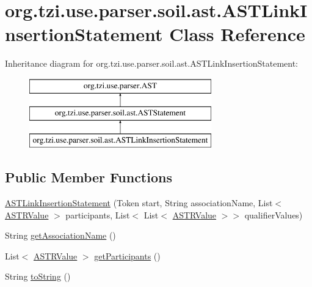 \hypertarget{classorg_1_1tzi_1_1use_1_1parser_1_1soil_1_1ast_1_1_a_s_t_link_insertion_statement}{\section{org.\-tzi.\-use.\-parser.\-soil.\-ast.\-A\-S\-T\-Link\-Insertion\-Statement Class Reference}
\label{classorg_1_1tzi_1_1use_1_1parser_1_1soil_1_1ast_1_1_a_s_t_link_insertion_statement}
}
Inheritance diagram for org.\-tzi.\-use.\-parser.\-soil.\-ast.\-A\-S\-T\-Link\-Insertion\-Statement\-:\begin{figure}[H]
\begin{center}
\leavevmode
\includegraphics[height=3.000000cm]{classorg_1_1tzi_1_1use_1_1parser_1_1soil_1_1ast_1_1_a_s_t_link_insertion_statement}
\end{center}
\end{figure}
\subsection*{Public Member Functions}
\begin{DoxyCompactItemize}
\item 
\hyperlink{classorg_1_1tzi_1_1use_1_1parser_1_1soil_1_1ast_1_1_a_s_t_link_insertion_statement_a12470613147ebed72fed8f2e2fc85adc}{A\-S\-T\-Link\-Insertion\-Statement} (Token start, String association\-Name, List$<$ \hyperlink{classorg_1_1tzi_1_1use_1_1parser_1_1soil_1_1ast_1_1_a_s_t_r_value}{A\-S\-T\-R\-Value} $>$ participants, List$<$ List$<$ \hyperlink{classorg_1_1tzi_1_1use_1_1parser_1_1soil_1_1ast_1_1_a_s_t_r_value}{A\-S\-T\-R\-Value} $>$$>$ qualifier\-Values)
\item 
String \hyperlink{classorg_1_1tzi_1_1use_1_1parser_1_1soil_1_1ast_1_1_a_s_t_link_insertion_statement_a2ca326efa2f0cce5b31b20ca9f563545}{get\-Association\-Name} ()
\item 
List$<$ \hyperlink{classorg_1_1tzi_1_1use_1_1parser_1_1soil_1_1ast_1_1_a_s_t_r_value}{A\-S\-T\-R\-Value} $>$ \hyperlink{classorg_1_1tzi_1_1use_1_1parser_1_1soil_1_1ast_1_1_a_s_t_link_insertion_statement_a26cd9c8c2673e403fb1c3aa8454af737}{get\-Participants} ()
\item 
String \hyperlink{classorg_1_1tzi_1_1use_1_1parser_1_1soil_1_1ast_1_1_a_s_t_link_insertion_statement_a02581f2d0b38e3f4701e46b2d6231fd6}{to\-String} ()
\end{DoxyCompactItemize}

